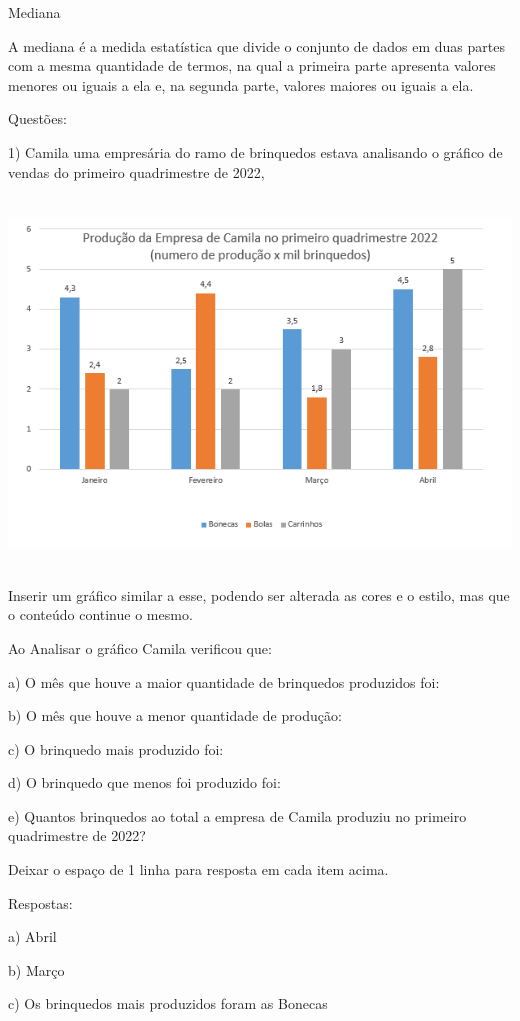 {Mediana

A mediana é a medida estatística que divide o conjunto de dados em duas
partes com a mesma quantidade de termos, na qual a primeira parte
apresenta valores menores ou iguais a ela e, na segunda parte, valores
maiores ou iguais a ela.

Questões:

1) Camila uma empresária do ramo de brinquedos estava analisando o
gráfico de vendas do primeiro quadrimestre de 2022,

\includegraphics[width=5.90625in,height=3.86458in]{./imgSAEB_8_MAT/media/image39.png}

Inserir um gráfico similar a esse, podendo ser alterada as cores e o
estilo, mas que o conteúdo continue o mesmo.

Ao Analisar o gráfico Camila verificou que:

a) O mês que houve a maior quantidade de brinquedos produzidos foi:

b) O mês que houve a menor quantidade de produção:

c) O brinquedo mais produzido foi:

d) O brinquedo que menos foi produzido foi:

e) Quantos brinquedos ao total a empresa de Camila produziu no primeiro
quadrimestre de 2022?

Deixar o espaço de 1 linha para resposta em cada item acima.

Respostas:

a) Abril

b) Março

c) Os brinquedos mais produzidos foram as Bonecas

}
